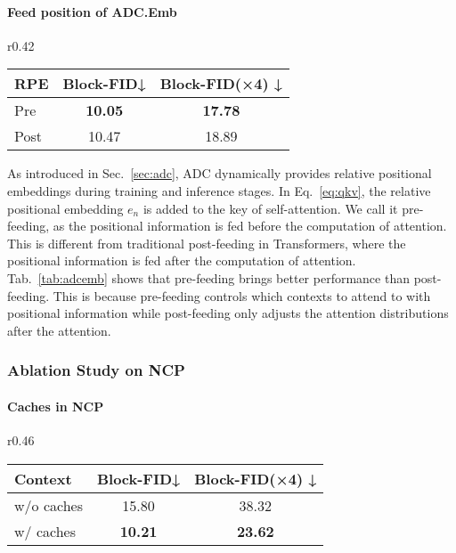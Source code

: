 \documentclass{article}
\begin{document}
\paragraph{Feed position of ADC.Emb} 
\begin{wraptable}[6]{r}{0.42\textwidth}
\vspace{-0.25in}
\centering
\vskip 0.1in
\setlength{\tabcolsep}{2.5pt}
\begin{tabular}{lcc}
    \toprule
    RPE  & Block-FID↓ & Block-FID(×4) ↓ \\ \hline
Pre  & \textbf{10.05}      & \textbf{17.78}         \\
    Post & 10.47      & 18.89  \\  
    \bottomrule
    \end{tabular}
\caption{Impact of feed position.}
 \label{tab:adcemb}
\end{wraptable}
As introduced in Sec.~\ref{sec:adc}, ADC dynamically provides relative positional embeddings during training and inference stages. In Eq.~\ref{eq:qkv}, the relative positional embedding $e_n$ is added to the key of self-attention. We call it pre-feeding, as the positional information is fed before the computation of attention. This is different from traditional post-feeding in Transformers, where the positional information is fed after the computation of attention. Tab.~\ref{tab:adcemb} shows that pre-feeding brings better performance than post-feeding. This is because pre-feeding controls which contexts to attend to with positional information while post-feeding only adjusts the attention distributions after the attention. 

















\subsubsection{Ablation Study on NCP}

\paragraph{Caches in NCP}
\begin{wraptable}[7]{r}{0.46\textwidth}
\vspace{-0.16in}
\centering
\setlength{\tabcolsep}{2pt}
\begin{tabular}{lcc}
\toprule
Context      & Block-FID↓ & Block-FID(×4) ↓ \\ 
\midrule
w/o caches & 15.80       & 38.32           \\
w/ caches  & \textbf{10.21}      & \textbf{23.62} \\
\bottomrule
\end{tabular}
\caption{Ablation results in caches in NCP.}
\label{tab:transfer}
\end{wraptable}
\end{document}
